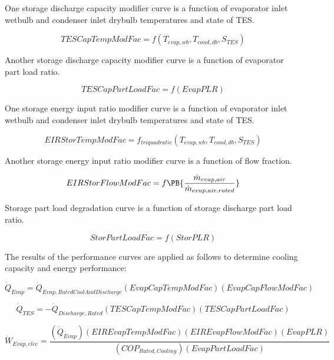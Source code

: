 One storage discharge capacity modifier curve is a function of evaporator inlet wetbulb and condenser inlet drybulb temperatures and state of TES.

\begin{equation}
TESCapTempModFac = f\left( {{T_{evap,wb}},{T_{cond,db}},{S_{TES}}} \right)
\end{equation}

Another storage discharge capacity modifier curve is a function of evaporator part load ratio.

\begin{equation}
TESCapPartLoadFac = f\left( {EvapPLR} \right)
\end{equation}

One storage energy input ratio modifier curve is a function of evaporator inlet wetbulb and condenser inlet drybulb temperatures and state of TES.

\begin{equation}
EIRStorTempModFac = {f_{triquadratic}}\left( {{T_{evap,wb}},{T_{cond,db}},{S_{TES}}} \right)
\end{equation}

Another storage energy input ratio modifier curve is a function of flow fraction.

\begin{equation}
  EIRStorFlowModFac = f\PB{\frac{\dot{m}_{evap,air}}{\dot{m}_{evap,air,rated}}}
\end{equation}

Storage part load degradation curve is a function of storage discharge part load ratio.

\begin{equation}
StorPartLoadFac = f\left( {StorPLR} \right)
\end{equation}

The results of the performance curves are applied as follows to determine cooling capacity and energy performance:

\begin{equation}
{\dot Q_{Evap}} = {\dot Q_{Evap,RatedCoolAndDischarge}}\left( {EvapCapTempModFac} \right)\left( {EvapCapFlowModFac} \right)
\end{equation}

\begin{equation}
{\dot Q_{TES}} =  - {\dot Q_{Discharge,Rated}}\left( {TESCapTempModFac} \right)\left( {TESCapPartLoadFac} \right)
\end{equation}

\begin{equation}
{\dot W_{Evap,elec}} = \frac{{\left( {{{\dot Q}_{Evap}}} \right)\left( {EIREvapTempModFac} \right)\left( {EIREvapFlowModFac} \right)\left( {EvapPLR} \right)}}{{\left( {CO{P_{Rated,Cooling}}} \right)\left( {EvapPartLoadFac} \right)}}
\end{equation}


